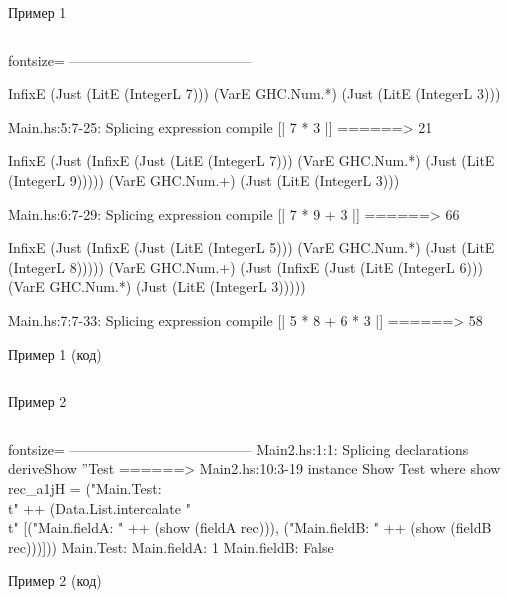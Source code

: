 \documentclass{beamer}
\begin{document}
\begin{frame}[fragile]{Пример 1}
\inputminted[fontsize=\tiny]{haskell}{examples/Main1.hs}
\begin{haskellcode*}{fontsize=\tiny}
---------------------------------------

InfixE (Just (LitE (IntegerL 7))) (VarE GHC.Num.*) (Just (LitE (IntegerL 3)))

Main.hs:5:7-25: Splicing expression
    compile [| 7 * 3 |] ======> 21

InfixE (Just (InfixE (Just (LitE (IntegerL 7))) (VarE GHC.Num.*) (Just (LitE (IntegerL 9)))))
(VarE GHC.Num.+) (Just (LitE (IntegerL 3)))

Main.hs:6:7-29: Splicing expression
    compile [| 7 * 9 + 3 |] ======> 66

InfixE (Just (InfixE (Just (LitE (IntegerL 5))) (VarE GHC.Num.*) (Just (LitE (IntegerL 8)))))
(VarE GHC.Num.+)
(Just (InfixE (Just (LitE (IntegerL 6))) (VarE GHC.Num.*) (Just (LitE (IntegerL 3)))))

Main.hs:7:7-33: Splicing expression
    compile [| 5 * 8 + 6 * 3 |] ======> 58
\end{haskellcode*}
\end{frame}

\begin{frame}[fragile]{Пример 1 (код)}
\inputminted[fontsize=\tiny]{haskell}{examples/TH1.hs}
\end{frame}

\begin{frame}[fragile]{Пример 2}
\inputminted[fontsize=\tiny]{haskell}{examples/Main2.hs}
\begin{haskellcode*}{fontsize=\tiny}
---------------------------------------
Main2.hs:1:1: Splicing declarations
    deriveShow ''Test
  ======>
    Main2.hs:10:3-19
    instance Show Test where
      show rec_a1jH
        = ("Main.Test:\
           \\t"
           ++
             (Data.List.intercalate
                "\
                \\t"
                [("Main.fieldA: " ++ (show (fieldA rec))),
                 ("Main.fieldB: " ++ (show (fieldB rec)))]))
Main.Test:
    Main.fieldA: 1
    Main.fieldB: False
\end{haskellcode*}
\end{frame}

\begin{frame}[fragile]{Пример 2 (код)}
\inputminted[fontsize=\tiny]{haskell}{examples/TH2.hs}
\end{frame}
\end{document}
